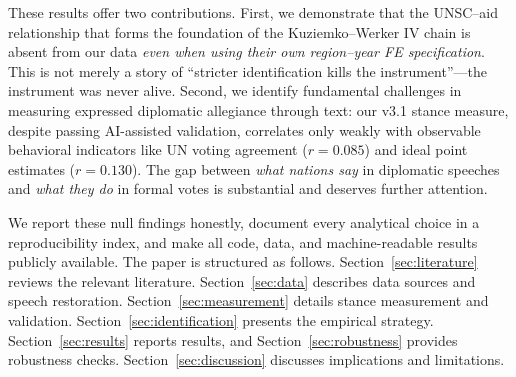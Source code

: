 These results offer two contributions. First, we demonstrate that the UNSC--aid relationship that forms the foundation of the Kuziemko--Werker IV chain is absent from our data \emph{even when using their own region--year FE specification}. This is not merely a story of ``stricter identification kills the instrument''---the instrument was never alive. Second, we identify fundamental challenges in measuring expressed diplomatic allegiance through text: our v3.1 stance measure, despite passing AI-assisted validation, correlates only weakly with observable behavioral indicators like UN voting agreement ($r=0.085$) and ideal point estimates ($r=0.130$). The gap between \emph{what nations say} in diplomatic speeches and \emph{what they do} in formal votes is substantial and deserves further attention.

We report these null findings honestly, document every analytical choice in a reproducibility index, and make all code, data, and machine-readable results publicly available. The paper is structured as follows. Section~\ref{sec:literature} reviews the relevant literature. Section~\ref{sec:data} describes data sources and speech restoration. Section~\ref{sec:measurement} details stance measurement and validation. Section~\ref{sec:identification} presents the empirical strategy. Section~\ref{sec:results} reports results, and Section~\ref{sec:robustness} provides robustness checks. Section~\ref{sec:discussion} discusses implications and limitations.
